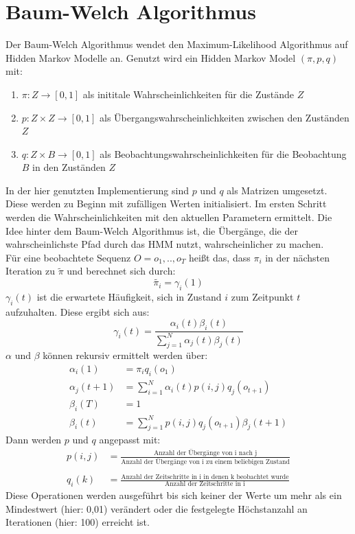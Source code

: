 \documentclass{article}
\begin{document}
\section{Baum-Welch Algorithmus}
\label{sec:BaumWelch}
Der Baum-Welch Algorithmus wendet den Maximum-Likelihood Algorithmus auf Hidden Markov Modelle an.
Genutzt wird ein Hidden Markov Model $(\pi, p, q)$ mit:
\begin{enumerate}
\item $\pi: Z \rightarrow [0,1]$ als inititale Wahrscheinlichkeiten für die Zustände $Z$
\item $p: Z \times Z \rightarrow [0,1]$ als Übergangswahrscheinlichkeiten zwischen den Zuständen $Z$
\item $q: Z \times B \rightarrow [0,1]$ als Beobachtungswahrscheinlichkeiten für die Beobachtung $B$ in den Zuständen $Z$
\end{enumerate}
In der hier genutzten Implementierung sind $p$ und $q$ als Matrizen umgesetzt.
Diese werden zu Beginn mit zufälligen Werten initialisiert.
Im ersten Schritt werden die Wahrscheinlichkeiten mit den aktuellen Parametern ermittelt.
Die Idee hinter dem Baum-Welch Algorithmus ist, die Übergänge, die der wahrscheinlichste Pfad durch das HMM nutzt, wahrscheinlicher zu machen.\\
Für eine beobachtete Sequenz $O = {o_1, .., o_T}$ heißt das, dass $\pi_i$ in der nächsten Iteration zu $\tilde{\pi}$ und berechnet sich durch:
\[
\tilde{\pi_i} = \gamma_i(1)
\]
$\gamma_i(t)$ ist die erwartete Häufigkeit, sich in Zustand $i$ zum Zeitpunkt $t$ aufzuhalten.
Diese ergibt sich aus:
\[
\gamma_i(t) = \frac{\alpha_i(t)\beta_i(t)}{\sum_{j=1}^{N}\alpha_j(t)\beta_j(t)}
\]
$\alpha$ und $\beta$ können rekursiv ermittelt werden über:
\begin{align*}
\alpha_i(1) &= \pi_iq_i(o_1) \\
\alpha_j(t+1) &= \sum_{i=1}^{N}\alpha_i(t)p(i, j)q_j(o_{t+1})\\
\beta_i(T) &= 1 \\
\beta_i(t) &= \sum_{j=1}^{N}p(i, j)q_j(o_{t+1})\beta_j(t+1)
\end{align*}
Dann werden $p$ und $q$ angepasst mit:
\begin{align*}
p(i, j) &= \frac{\text{Anzahl der Übergänge von i nach j}}{\text{Anzahl der Übergänge von i zu einem beliebigen Zustand}}\\
\\
q_i(k) &= \frac{\text{Anzahl der Zeitschritte in i in denen k beobachtet wurde}}{\text{Anzahl der Zeitschritte in i}}
\end{align*}
Diese Operationen werden ausgeführt bis sich keiner der Werte um mehr als ein Mindestwert (hier: 0,01) verändert oder die festgelegte Höchstanzahl an Iterationen (hier: 100) erreicht ist.
\end{document}
